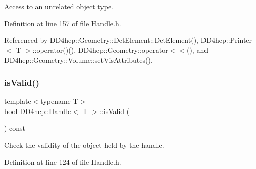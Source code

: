 Access to an unrelated object type. 



Definition at line 157 of file Handle.\+h.



Referenced by D\+D4hep\+::\+Geometry\+::\+Det\+Element\+::\+Det\+Element(), D\+D4hep\+::\+Printer$<$ T $>$\+::operator()(), D\+D4hep\+::\+Geometry\+::operator$<$$<$(), and D\+D4hep\+::\+Geometry\+::\+Volume\+::set\+Vis\+Attributes().

\hypertarget{class_d_d4hep_1_1_handle_a7e69d51e089a24a1773603dfa3fe5eac}{}\label{class_d_d4hep_1_1_handle_a7e69d51e089a24a1773603dfa3fe5eac} 
\subsubsection{\texorpdfstring{is\+Valid()}{isValid()}}
{\footnotesize\ttfamily template$<$typename T$>$ \\
bool \hyperlink{class_d_d4hep_1_1_handle}{D\+D4hep\+::\+Handle}$<$ \hyperlink{class_t}{T} $>$\+::is\+Valid (\begin{DoxyParamCaption}{ }\end{DoxyParamCaption}) const\hspace{0.3cm}{\ttfamily [inline]}}



Check the validity of the object held by the handle. 



Definition at line 124 of file Handle.\+h.



